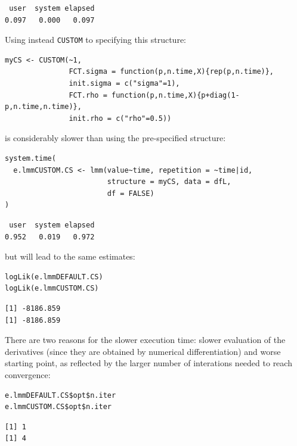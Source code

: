 \documentclass[12pt]{article}
\begin{document}
\begin{verbatim}
 user  system elapsed 
0.097   0.000   0.097
\end{verbatim}


Using instead \texttt{CUSTOM} to specifying this structure:
\lstset{language=r,label= ,caption= ,captionpos=b,numbers=none}
\begin{lstlisting}
myCS <- CUSTOM(~1,
               FCT.sigma = function(p,n.time,X){rep(p,n.time)},
               init.sigma = c("sigma"=1), 
               FCT.rho = function(p,n.time,X){p+diag(1-p,n.time,n.time)},
               init.rho = c("rho"=0.5))
\end{lstlisting}

is considerably slower than using the pre-specified structure:
\lstset{language=r,label= ,caption= ,captionpos=b,numbers=none}
\begin{lstlisting}
system.time(
  e.lmmCUSTOM.CS <- lmm(value~time, repetition = ~time|id,
                        structure = myCS, data = dfL,
                        df = FALSE)
)
\end{lstlisting}

\begin{verbatim}
 user  system elapsed 
0.952   0.019   0.972
\end{verbatim}



but will lead to the same estimates:
\lstset{language=r,label= ,caption= ,captionpos=b,numbers=none}
\begin{lstlisting}
logLik(e.lmmDEFAULT.CS)
logLik(e.lmmCUSTOM.CS)
\end{lstlisting}

\begin{verbatim}
[1] -8186.859
[1] -8186.859
\end{verbatim}


There are two reasons for the slower execution time: slower evaluation
of the derivatives (since they are obtained by numerical
differentiation) and worse starting point, as reflected by the larger
number of interations needed to reach convergence:
\lstset{language=r,label= ,caption= ,captionpos=b,numbers=none}
\begin{lstlisting}
e.lmmDEFAULT.CS$opt$n.iter
e.lmmCUSTOM.CS$opt$n.iter
\end{lstlisting}

\begin{verbatim}
[1] 1
[1] 4
\end{verbatim}
\end{document}
